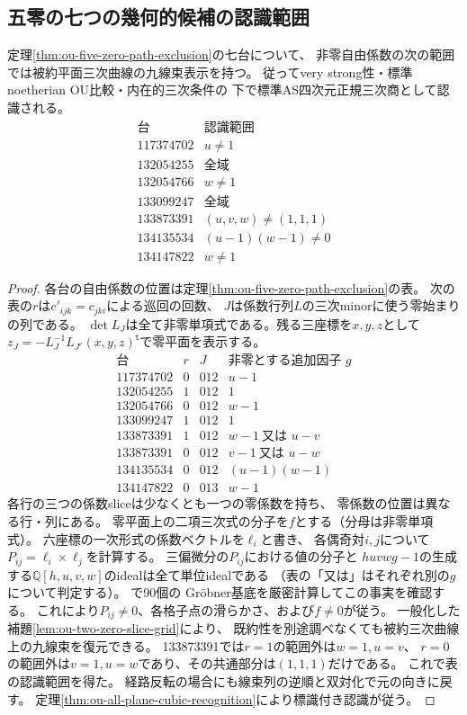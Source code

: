 \subsection{五零の七つの幾何的候補の認識範囲}

\begin{theorem}[五零係数の滑らかな格子点による認識]
\label{thm:ou-five-zero-grid-recognition}
定理\ref{thm:ou-five-zero-path-exclusion}の七台について、
非零自由係数の次の範囲では被約平面三次曲線の九線束表示を持つ。
従ってvery strong性・標準noetherian OU比較・内在的三次条件の
下で標準AS四次元正規三次商として認識される。
\[
\begin{array}{r|l}
\text{台}&\text{認識範囲}\\ \hline
117374702&u\ne1\\
132054255&\text{全域}\\
132054766&w\ne1\\
133099247&\text{全域}\\
133873391&(u,v,w)\ne(1,1,1)\\
134135534&(u-1)(w-1)\ne0\\
134147822&w\ne1
\end{array}
\]
\end{theorem}
\begin{proof}
各台の自由係数の位置は定理\ref{thm:ou-five-zero-path-exclusion}の表。
次の表の$r$は$c'_{ijk}=c_{jki}$による巡回の回数、
$J$は係数行列$L$の三次minorに使う零始まりの列である。
$\det L_J$は全て非零単項式である。残る三座標を$x,y,z$として
$z_J=-L_J^{-1}L_{J^c}(x,y,z)^{\mathsf t}$で零平面を表示する。
\[
\begin{array}{r|c|c|l}
\text{台}&r&J&\text{非零とする追加因子 }g\\ \hline
117374702&0&012&u-1\\
132054255&1&012&1\\
132054766&0&012&w-1\\
133099247&1&012&1\\
133873391&1&012&w-1\ \text{又は }u-v\\
133873391&0&012&v-1\ \text{又は }u-w\\
134135534&0&012&(u-1)(w-1)\\
134147822&0&013&w-1
\end{array}
\]
各行の三つの係数sliceは少なくとも一つの零係数を持ち、
零係数の位置は異なる行・列にある。
零平面上の二項三次式の分子を$f$とする（分母は非零単項式）。
六座標の一次形式の係数ベクトルを$\ell_i$と書き、
各偶奇対$i,j$について$P_{ij}=\ell_i\times\ell_j$を計算する。
三偏微分の$P_{ij}$における値の分子と
$huvwg-1$の生成する$\mathbb Q[h,u,v,w]$のidealは全て単位idealである
（表の「又は」はそれぞれ別の$g$について判定する）。
で90個の
Gröbner基底を厳密計算してこの事実を確認する。
これにより$P_{ij}\ne0$、各格子点の滑らかさ、および$f\ne0$が従う。
一般化した補題\ref{lem:ou-two-zero-slice-grid}により、
既約性を別途調べなくても被約三次曲線上の九線束を復元できる。
133873391では$r=1$の範囲外は$w=1,u=v$、
$r=0$の範囲外は$v=1,u=w$であり、その共通部分は$(1,1,1)$だけである。
これで表の認識範囲を得た。
経路反転の場合にも線束列の逆順と双対化で元の向きに戻す。
定理\ref{thm:ou-all-plane-cubic-recognition}により標識付き認識が従う。
\end{proof}

